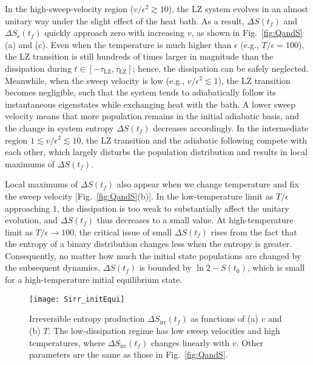 \documentclass[english,nofootinbib, pra, twocolumn,superscriptaddress]{revtex4-1}
\begin{document}
In the high-sweep-velocity region ($v/\epsilon^{2}\apprge10$), the
LZ system evolves in an almost unitary way under the slight effect of 
the heat bath. As a result, $\Delta S(t_{f})$ and $\Delta S_{\text{e}}(t_{f})$
quickly approach zero with increasing $v$, as shown in Fig.~\ref{fig:QandS}(a)
and (c). Even when the temperature is much higher than $\epsilon$ (e.g., $T/\epsilon=100$), the LZ transition is still hundreds
of times larger in magnitude than the dissipation during $t\in[-\tau_{\text{LZ}},\tau_{\text{LZ}}]$;
hence, the dissipation can be safely neglected. Meanwhile,
when the sweep velocity is low (e.g., $v/\epsilon^{2}\apprle1$), the
LZ transition becomes negligible, such that the system tends to
adiabatically follow its instantaneous eigenstates while exchanging
heat with the bath. A lower sweep velocity means that more population
remains in the initial adiabatic basis, and the change in system entropy
$\Delta S(t_{f})$ decreases accordingly. In the intermediate region
$1\apprle v/\epsilon^{2}\apprle10$, the LZ transition and the adiabatic
following compete with each other, which largely disturbs the population
distribution and results in local maximums of $\Delta S(t_{f})$.

Local maximums of $\Delta S(t_{f})$ also appear when we change temperature
and fix the sweep velocity [Fig.~\ref{fig:QandS}(b)]. In the
low-temperature limit as $T/\epsilon$ approaching $1$, the dissipation
is too weak to substantially affect the unitary evolution,
and $\Delta S(t_{f})$ thus decreases to a small value. At high-temperature
limit as $T/\epsilon\rightarrow100$, the critical issue of small $\Delta S(t_{f})$ rises from the fact that the entropy of a
binary distribution changes less when the entropy is greater. Consequently, no matter how much the initial state populations
are changed by the subsequent dynamics, $\Delta S(t_{f})$ is bounded
by $\ln2-S(t_{0})$, which is small for a high-temperature initial equilibrium state. 

\begin{figure*}
\texttt{[image: Sirr\_initEqui]}\caption{Irreversible entropy production $\Delta S_{\text{irr}}(t_{f})$
as functions of (a) $v$ and (b) $T$. The low-dissipation regime
has low sweep velocities and high temperatures, where $\Delta S_{\text{irr}}(t_{f})$
changes linearly with $v$. Other parameters are the same as those in Fig.~\ref{fig:QandS}.}
\label{fig:Sirr}
\end{figure*}
\end{document}
